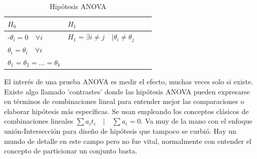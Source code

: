 \documentclass[11pt,a4paper,oneside]{report}
\theoremstyle{definition}
\theoremstyle{plain}
\theoremstyle{remark}
\begin{document}
\begin{table}[H]
  \centering
  \caption{Hipótesis ANOVA}
  \begin{tabular}{@{}l >{\centering\arraybackslash}p{2.2cm}
                    >{\centering\arraybackslash}p{2.2cm}
                    >{\centering\arraybackslash}p{2.2cm}@{}}
    \toprule
    $H_0$ & $H_1$ \\
    \midrule
   -$\theta_i=0 \quad \forall i$ & $H_1=\exists i \not = j \quad | \theta_i \not = \theta_j$ \\
    $\theta_i=\theta_i \quad \forall i$ & \\
    $\theta_1=\theta_2=...=\theta_k$ & \\
    \bottomrule
  \end{tabular}
\end{table}

El interés de una prueba ANOVA es medir el efecto, muchas veces solo si existe.\\
Existe algo llamado 'contrastes' donde las hipótesis ANOVA pueden expresarse en 
términos de combinaciones lineal para entender mejor las comparaciones o elaborar 
hipótesis más específicas. Se usan empleando los conceptos clásicos de combinaciones lineales 
$\sum a_it_i \quad | \quad \sum a_i=0$. Va muy de la mano con el enfoque unión-Intersección
para diseño de hipótesis que tampoco se curbió. Hay un mundo de detalle en este campo pero no fue
vital, normalmente con entender el concepto de particionar un conjunto basta.\\



\printindex
\end{document}
